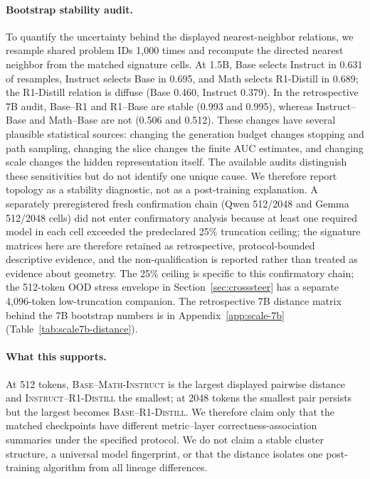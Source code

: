 \paragraph{Bootstrap stability audit.}
To quantify the uncertainty behind the displayed nearest-neighbor relations, we
resample shared problem IDs 1,000 times and recompute the directed nearest
neighbor from the matched signature cells.  At 1.5B, Base selects Instruct in
0.631 of resamples, Instruct selects Base in 0.695, and Math selects R1-Distill
in 0.689; the R1-Distill relation is diffuse (Base 0.460, Instruct 0.379).  In
the retrospective 7B audit, Base--R1 and R1--Base are stable (0.993 and 0.995),
whereas Instruct--Base and Math--Base are not (0.506 and 0.512).
These changes have several plausible statistical sources: changing the generation
budget changes stopping and path sampling, changing the slice changes the finite
AUC estimates, and changing scale changes the hidden representation itself.  The
available audits distinguish these sensitivities but do not identify one unique
cause.  We therefore report topology as a stability diagnostic, not as a
post-training explanation.  A separately preregistered fresh confirmation
chain (Qwen 512/2048 and Gemma 512/2048 cells) did not enter confirmatory
analysis because at least one required model in each cell exceeded the
predeclared 25\% truncation ceiling; the signature matrices here are
therefore retained as retrospective, protocol-bounded descriptive evidence,
and the non-qualification is reported rather than treated as evidence about
geometry.  The 25\% ceiling is specific to this confirmatory chain; the
512-token OOD stress envelope in Section~\ref{sec:crosssteer} has a separate
4,096-token low-truncation companion.  The retrospective 7B distance matrix behind the
7B bootstrap numbers is in Appendix~\ref{app:scale-7b} (Table~\ref{tab:scale7b-distance}).

\paragraph{What this supports.}
At 512 tokens, \textsc{Base}--\textsc{Math-Instruct} is the largest displayed
pairwise distance and \textsc{Instruct}--\textsc{R1-Distill} the smallest; at
2048 tokens the smallest pair persists but the largest becomes
\textsc{Base}--\textsc{R1-Distill}.  We therefore
claim only that the matched checkpoints have different metric--layer
correctness-association summaries under the specified protocol.  We do not claim
a stable cluster structure, a universal model fingerprint, or that the distance isolates one
post-training algorithm from all lineage differences.

